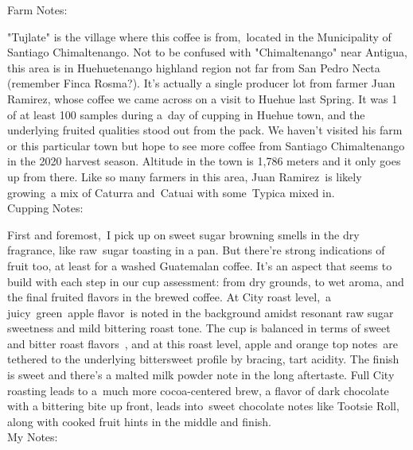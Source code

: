 \documentclass[10pt,twoside,footinclude=true,headinclude=true]{scrbook} %
\newlength{\mysize}
\newcommand{\myfontsize}[1]{
  \setlength{\mysize}{#1pt}
  \fontsize{\mysize}{1.2\mysize}
  \selectfont
}
\begin{document}

\newpage
\vspace*{-2.2em}
\raggedright
\normalsize
Farm Notes: \\
\myfontsize{8}
"Tujlate" is the village where this coffee is from, located in the Municipality of Santiago Chimaltenango. Not to be confused with "Chimaltenango" near Antigua, this area is in Huehuetenango highland region not far from San Pedro Necta (remember Finca Rosma?). It's actually a single producer lot from farmer Juan Ramirez, whose coffee we came across on a visit to Huehue last Spring. It was 1 of at least 100 samples during a day of cupping in Huehue town, and the underlying fruited qualities stood out from the pack. We haven't visited his farm or this particular town but hope to see more coffee from Santiago Chimaltenango in the 2020 harvest season. Altitude in the town is 1,786 meters and it only goes up from there. Like so many farmers in this area, Juan Ramirez is likely growing a mix of Caturra and Catuai with some Typica mixed in. \\
\medskip
\normalsize
Cupping Notes: \\
\myfontsize{8}
First and foremost, I pick up on sweet sugar browning smells in the dry fragrance, like raw sugar toasting in a pan. But there're strong indications of fruit too, at least for a washed Guatemalan coffee. It's an aspect that seems to build with each step in our cup assessment: from dry grounds, to wet aroma, and the final fruited flavors in the brewed coffee. At City roast level, a juicy green apple flavor is noted in the background amidst resonant raw sugar sweetness and mild bittering roast tone. The cup is balanced in terms of sweet and bitter roast flavors , and at this roast level, apple and orange top notes are tethered to the underlying bittersweet profile by bracing, tart acidity. The finish is sweet and there's a malted milk powder note in the long aftertaste. Full City roasting leads to a much more cocoa-centered brew, a flavor of dark chocolate with a bittering bite up front, leads into sweet chocolate notes like Tootsie Roll, along with cooked fruit hints in the middle and finish. \\
\medskip
\normalsize
My Notes:
\end{document}

